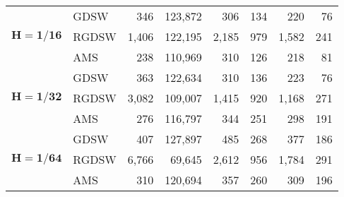 \begin{table}[H]
\begin{tabular}{llrrrrrr}
\cline{1-8} \cline{2-8}
\multirow[c]{3}{*}{$\mathbf{H=1/16}$} & GDSW & 346 & {\cellcolor[HTML]{E2E4FB}} \color[HTML]{000000} 123,872 & {\cellcolor[HTML]{405FE5}} \color[HTML]{F1F1F1} 306 & {\cellcolor[HTML]{ACB8F4}} \color[HTML]{000000} 134 & {\cellcolor[HTML]{768BEC}} \color[HTML]{F1F1F1} 220 & 76 \\
\cline{2-8}
 & RGDSW & 1,406 & {\cellcolor[HTML]{E2E4FB}} \color[HTML]{000000} 122,195 & {\cellcolor[HTML]{ACB8F4}} \color[HTML]{000000} 2,185 & {\cellcolor[HTML]{768BEC}} \color[HTML]{F1F1F1} 979 & {\cellcolor[HTML]{405FE5}} \color[HTML]{F1F1F1} 1,582 & 241 \\
\cline{2-8}
 & AMS & 238 & {\cellcolor[HTML]{E2E4FB}} \color[HTML]{000000} 110,969 & {\cellcolor[HTML]{768BEC}} \color[HTML]{F1F1F1} 310 & {\cellcolor[HTML]{ACB8F4}} \color[HTML]{000000} 126 & {\cellcolor[HTML]{405FE5}} \color[HTML]{F1F1F1} 218 & 81 \\
\cline{1-8} \cline{2-8}
\multirow[c]{3}{*}{$\mathbf{H=1/32}$} & GDSW & 363 & {\cellcolor[HTML]{E2E4FB}} \color[HTML]{000000} 122,634 & {\cellcolor[HTML]{405FE5}} \color[HTML]{F1F1F1} 310 & {\cellcolor[HTML]{ACB8F4}} \color[HTML]{000000} 136 & {\cellcolor[HTML]{768BEC}} \color[HTML]{F1F1F1} 223 & 76 \\
\cline{2-8}
 & RGDSW & 3,082 & {\cellcolor[HTML]{E2E4FB}} \color[HTML]{000000} 109,007 & {\cellcolor[HTML]{405FE5}} \color[HTML]{F1F1F1} 1,415 & {\cellcolor[HTML]{ACB8F4}} \color[HTML]{000000} 920 & {\cellcolor[HTML]{768BEC}} \color[HTML]{F1F1F1} 1,168 & 271 \\
\cline{2-8}
 & AMS & 276 & {\cellcolor[HTML]{E2E4FB}} \color[HTML]{000000} 116,797 & {\cellcolor[HTML]{ACB8F4}} \color[HTML]{000000} 344 & {\cellcolor[HTML]{768BEC}} \color[HTML]{F1F1F1} 251 & {\cellcolor[HTML]{405FE5}} \color[HTML]{F1F1F1} 298 & 191 \\
\cline{1-8} \cline{2-8}
\multirow[c]{3}{*}{$\mathbf{H=1/64}$} & GDSW & 407 & {\cellcolor[HTML]{E2E4FB}} \color[HTML]{000000} 127,897 & {\cellcolor[HTML]{768BEC}} \color[HTML]{F1F1F1} 485 & {\cellcolor[HTML]{ACB8F4}} \color[HTML]{000000} 268 & {\cellcolor[HTML]{405FE5}} \color[HTML]{F1F1F1} 377 & 186 \\
\cline{2-8}
 & RGDSW & 6,766 & {\cellcolor[HTML]{E2E4FB}} \color[HTML]{000000} 69,645 & {\cellcolor[HTML]{405FE5}} \color[HTML]{F1F1F1} 2,612 & {\cellcolor[HTML]{ACB8F4}} \color[HTML]{000000} 956 & {\cellcolor[HTML]{768BEC}} \color[HTML]{F1F1F1} 1,784 & 291 \\
\cline{2-8}
 & AMS & 310 & {\cellcolor[HTML]{E2E4FB}} \color[HTML]{000000} 120,694 & {\cellcolor[HTML]{768BEC}} \color[HTML]{F1F1F1} 357 & {\cellcolor[HTML]{ACB8F4}} \color[HTML]{000000} 260 & {\cellcolor[HTML]{405FE5}} \color[HTML]{F1F1F1} 309 & 196 \\
\cline{1-8} \cline{2-8}
\bottomrule
\end{tabular}
\end{table}

